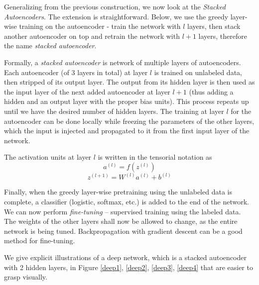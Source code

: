 \documentclass[12pt]{article}  %
\begin{document}
Generalizing from the previous construction, we now look at the \emph{Stacked Autoencoders}. The extension is straightforward. Below, we use the greedy layer-wise training on the autoencoder - train the network with $l$ layers, then stack another autoencoder on top and retrain the network with $l+1$ layers, therefore the name \emph{stacked autoencoder}.

Formally, a \emph{stacked autoencoder} is network of multiple layers of autoencoders. Each autoencoder (of 3 layers in total) at layer $l$ is trained on unlabeled data, then stripped of its output layer. The output from its hidden layer is then used as the input layer of the next added autoencoder at layer $l+1$ (thus adding a hidden and an output layer with the proper bias units). This process repeats up until we have the desired number of hidden layers. The training at layer $l$ for the autoencoder can be done locally while freezing the parameters of the other layers, which the input is injected and propagated to it from the first input layer of the network.

The activation units at layer $l$ is written in the tensorial notation as 
$$a^{(l)} = f(z^{(l)})$$
$$z^{(l+1)} = W^{(l)}a^{(l)} + b^{(l)}$$

Finally, when the greedy layer-wise pretraining using the unlabeled data is complete, a classifier (logistic, softmax, etc.) is added to the end of the network. We can now perform \emph{fine-tuning} – supervised training using the labeled data. The weights of the other layers shall now be allowed to change, as the entire network is being tuned. Backpropagation with gradient descent can be a good method for fine-tuning.

We give explicit illustrations of a deep network, which is a stacked autoencoder with 2 hidden layers, in Figure \ref{deep1}, \ref{deep2}, \ref{deep3}, \ref{deep4} that are easier to grasp visually.
\end{document}
